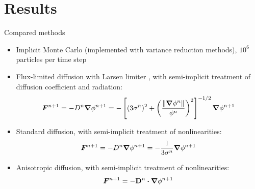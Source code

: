 \documentclass{beamer}
\begin{document}
\section{Results}
\begin{frame}{Compared methods}
\begin{itemize}
  \item Implicit Monte Carlo \cite{Fle1971} (implemented with variance
    reduction methods), $10^6$ particles per time step
  \item Flux-limited diffusion with Larsen limiter \cite{Ols2000}, with
    semi-implicit treatment of diffusion coefficient and radiation:
    \begin{equation*}
      \bm{F}^{n+1} = - D^{n} \bm{\nabla} \phi^{n+1}  = -\left[ (3\sigma^{n})^2
      + \left( \frac{\left\| \bm{\nabla} \phi^{n} \right\|}{\phi^{n}}  \right)^2 \right]^{-1/2}
      \bm{\nabla} \phi^{n+1}
    \end{equation*}
  \item Standard diffusion, with semi-implicit treatment of nonlinearities:
    \begin{equation*}
      \bm{F}^{n+1} = - D^{n} \bm{\nabla} \phi^{n+1} 
      = -\frac{1}{3\sigma^{n}} \bm{\nabla} \phi^{n+1}
    \end{equation*}
  \item Anisotropic diffusion, with semi-implicit treatment of nonlinearities:
    \begin{equation*}
      \bm{F}^{n+1} = -\mathbf{D}^{n}\bm{\cdot} \bm{\nabla} \phi^{n+1} 
    \end{equation*}
\end{itemize}
\end{frame}
\end{document}
